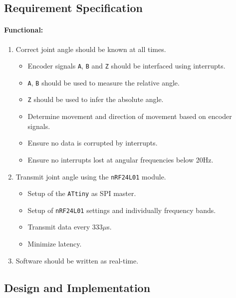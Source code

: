 \subsection{Requirement Specification} 

\paragraph{Functional:}
\begin{enumerate}[resume]
	\item Correct joint angle should be known at all times.
	\label{enum:joint_correct_angles}
	\begin{itemize}
		\item Encoder signals \texttt{A}, \texttt{B} and \texttt{Z} should be interfaced using interrupts.
		\item \texttt{A}, \texttt{B} should be used to measure the relative angle.
		\item \texttt{Z} should be used to infer the absolute angle. 
		\item Determine movement and direction of movement based on encoder signals.
		\item Ensure no data is corrupted by interrupts.
		\item Ensure no interrupts lost at angular frequencies below 20Hz.
	\end{itemize}
	\item Transmit joint angle using the \texttt{nRF24L01} module.
	\label{enum:joint_transmit}
	\begin{itemize}
		\item Setup of the \texttt{ATtiny} as SPI master.
		\item Setup of \texttt{nRF24L01} settings and individually frequency bands.
		\item Transmit data every 333$\mu$s.
		\item Minimize latency.
	\end{itemize}
	\item Software should be written as real-time.
	\label{enum:joint_real_time}
\end{enumerate}

\subsection{Design and Implementation} %
\label{sub:design_and_implementation}

